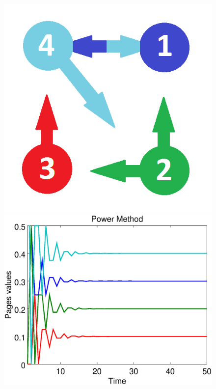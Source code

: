 \documentclass{beamer}
\begin{document}
\begin{frame}
	\vspace{-0.5cm}
\begin{figure}[!htb]
	\centering
	\includegraphics[scale=0.2]{figures/grafo}\\
	\includegraphics[scale=0.25]{figures/50/powermetod.eps}
	\hspace{0.1cm}

\end{figure}
\end{frame}
\end{document}

